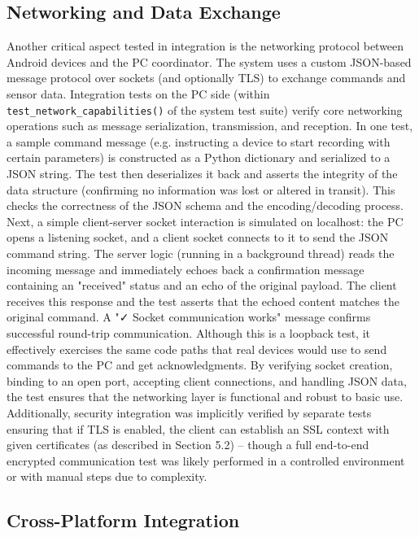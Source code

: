 \subsection{Networking and Data Exchange}

Another critical aspect tested in integration is the networking protocol between Android devices and the PC coordinator. The system uses a custom JSON-based message protocol over sockets (and optionally TLS) to exchange commands and sensor data. Integration tests on the PC side (within \texttt{test\_network\_capabilities()} of the system test suite) verify core networking operations such as message serialization, transmission, and reception. In one test, a sample command message (e.g. instructing a device to start recording with certain parameters) is constructed as a Python dictionary and serialized to a JSON string. The test then deserializes it back and asserts the integrity of the data structure (confirming no information was lost or altered in transit). This checks the correctness of the JSON schema and the encoding/decoding process. Next, a simple client-server socket interaction is simulated on localhost: the PC opens a listening socket, and a client socket connects to it to send the JSON command string. The server logic (running in a background thread) reads the incoming message and immediately echoes back a confirmation message containing an "received" status and an echo of the original payload. The client receives this response and the test asserts that the echoed content matches the original command. A "✓ Socket communication works" message confirms successful round-trip communication. Although this is a loopback test, it effectively exercises the same code paths that real devices would use to send commands to the PC and get acknowledgments. By verifying socket creation, binding to an open port, accepting client connections, and handling JSON data, the test ensures that the networking layer is functional and robust to basic use. Additionally, security integration was implicitly verified by separate tests ensuring that if TLS is enabled, the client can establish an SSL context with given certificates (as described in Section 5.2) – though a full end-to-end encrypted communication test was likely performed in a controlled environment or with manual steps due to complexity.

\subsection{Cross-Platform Integration}

